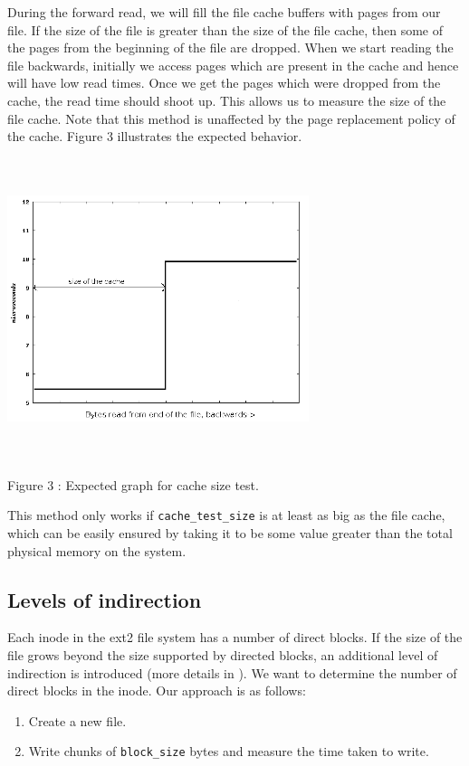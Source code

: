 \documentclass[twocolumn,11pt]{article}
\begin{document}
\begin{sloppypar}
During the forward read, we will fill the file cache buffers with pages from our
file. If the size of the file is greater than the size of the file cache, then
some of the pages from the beginning of the file are dropped. When we start
reading the file backwards, initially we access pages which are present in the
cache and hence will have low read times. Once we get the pages which were 
dropped from the cache, the read time should shoot up. This allows us to measure
the size of the file cache. Note that this method is unaffected by the page
replacement policy of the cache. Figure 3 illustrates the expected behavior.

\includegraphics[width=250pt,height=250pt]{cache_ideal.png}
\begin{center}
Figure 3 : Expected graph for cache size test.
\end{center}

This method only works if {\tt cache\_test\_size} is at least as big as the 
file cache, which can be easily ensured by taking it to be some value greater than
the total physical memory on the system.

\subsection{Levels of indirection}
Each inode in the ext2 file system has a number of direct blocks. If the size
of the file grows beyond the size supported by directed blocks, an additional
level of indirection is introduced (more details in \cite{ext2_loi}). We want to determine
the number of direct blocks in the inode. Our approach is as follows:

\begin{enumerate}
	\item Create a new file.
	\item Write chunks of {\tt block\_size} bytes and measure the time taken
		to write.
\end{enumerate}


\end{sloppypar}
\end{document}
